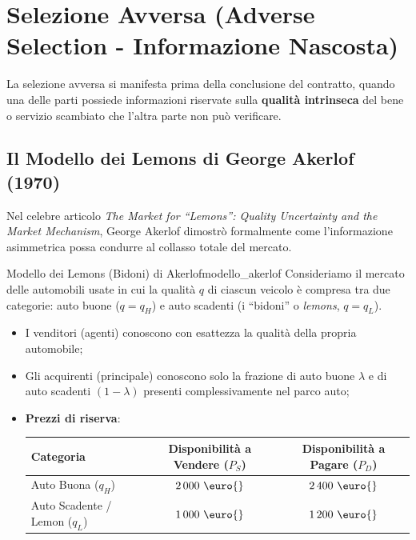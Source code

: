 \section{Selezione Avversa (Adverse Selection - Informazione Nascosta)}

La selezione avversa si manifesta prima della conclusione del contratto, quando una delle parti possiede informazioni riservate sulla \textbf{qualità intrinseca} del bene o servizio scambiato che l'altra parte non può verificare.

\subsection{Il Modello dei Lemons di George Akerlof (1970)}
Nel celebre articolo \textit{The Market for ``Lemons'': Quality Uncertainty and the Market Mechanism}, George Akerlof dimostrò formalmente come l'informazione asimmetrica possa condurre al collasso totale del mercato.

\begin{modello}{Modello dei Lemons (Bidoni) di Akerlof}{modello_akerlof}
Consideriamo il mercato delle automobili usate in cui la qualità $q$ di ciascun veicolo è compresa tra due categorie: auto buone ($q = q_H$) e auto scadenti (i ``bidoni'' o \textit{lemons}, $q = q_L$).
\begin{itemize}
    \item I venditori (agenti) conoscono con esattezza la qualità della propria automobile;
    \item Gli acquirenti (principale) conoscono solo la frazione di auto buone $\lambda$ e di auto scadenti $(1 - \lambda)$ presenti complessivamente nel parco auto;
    \item \textbf{Prezzi di riserva}:
    \begin{center}
    \begin{tabular}{lcc}
    \toprule
    \textbf{Categoria} & \textbf{Disponibilità a Vendere ($P_S$)} & \textbf{Disponibilità a Pagare ($P_D$)} \\
    \midrule
    Auto Buona ($q_H$) & $2\,000\text{ \euro{}}$ & $2\,400\text{ \euro{}}$ \\
    Auto Scadente / Lemon ($q_L$) & $1\,000\text{ \euro{}}$ & $1\,200\text{ \euro{}}$ \\
    \bottomrule
    \end{tabular}
    \end{center}
\end{itemize}
\end{modello}


